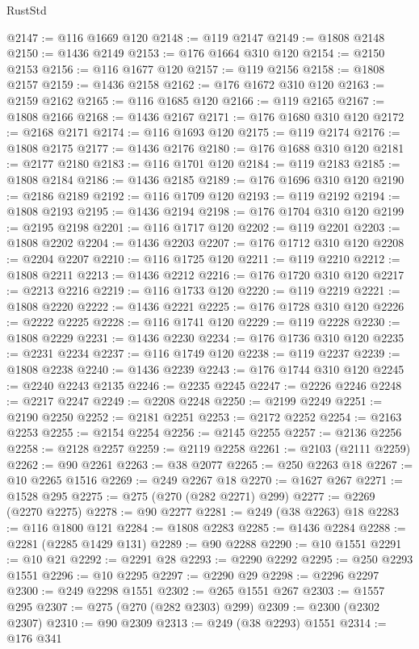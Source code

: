 \begin{lexlean}{RustStd}
\begin{coremodule}
@2147 := @116 @1669 @120
@2148 := @119 @2147
@2149 := @1808 @2148
@2150 := @1436 @2149
@2153 := @176 @1664 @310 @120
@2154 := @2150 @2153
@2156 := @116 @1677 @120
@2157 := @119 @2156
@2158 := @1808 @2157
@2159 := @1436 @2158
@2162 := @176 @1672 @310 @120
@2163 := @2159 @2162
@2165 := @116 @1685 @120
@2166 := @119 @2165
@2167 := @1808 @2166
@2168 := @1436 @2167
@2171 := @176 @1680 @310 @120
@2172 := @2168 @2171
@2174 := @116 @1693 @120
@2175 := @119 @2174
@2176 := @1808 @2175
@2177 := @1436 @2176
@2180 := @176 @1688 @310 @120
@2181 := @2177 @2180
@2183 := @116 @1701 @120
@2184 := @119 @2183
@2185 := @1808 @2184
@2186 := @1436 @2185
@2189 := @176 @1696 @310 @120
@2190 := @2186 @2189
@2192 := @116 @1709 @120
@2193 := @119 @2192
@2194 := @1808 @2193
@2195 := @1436 @2194
@2198 := @176 @1704 @310 @120
@2199 := @2195 @2198
@2201 := @116 @1717 @120
@2202 := @119 @2201
@2203 := @1808 @2202
@2204 := @1436 @2203
@2207 := @176 @1712 @310 @120
@2208 := @2204 @2207
@2210 := @116 @1725 @120
@2211 := @119 @2210
@2212 := @1808 @2211
@2213 := @1436 @2212
@2216 := @176 @1720 @310 @120
@2217 := @2213 @2216
@2219 := @116 @1733 @120
@2220 := @119 @2219
@2221 := @1808 @2220
@2222 := @1436 @2221
@2225 := @176 @1728 @310 @120
@2226 := @2222 @2225
@2228 := @116 @1741 @120
@2229 := @119 @2228
@2230 := @1808 @2229
@2231 := @1436 @2230
@2234 := @176 @1736 @310 @120
@2235 := @2231 @2234
@2237 := @116 @1749 @120
@2238 := @119 @2237
@2239 := @1808 @2238
@2240 := @1436 @2239
@2243 := @176 @1744 @310 @120
@2245 := @2240 @2243 @2135
@2246 := @2235 @2245
@2247 := @2226 @2246
@2248 := @2217 @2247
@2249 := @2208 @2248
@2250 := @2199 @2249
@2251 := @2190 @2250
@2252 := @2181 @2251
@2253 := @2172 @2252
@2254 := @2163 @2253
@2255 := @2154 @2254
@2256 := @2145 @2255
@2257 := @2136 @2256
@2258 := @2128 @2257
@2259 := @2119 @2258
@2261 := @2103 (@2111 @2259)
@2262 := @90 @2261
@2263 := @38 @2077
@2265 := @250 @2263 @18
@2267 := @10 @2265 @1516
@2269 := @249 @2267 @18
@2270 := @1627 @267
@2271 := @1528 @295
@2275 := @275 (@270 (@282 @2271) @299)
@2277 := @2269 (@2270 @2275)
@2278 := @90 @2277
@2281 := @249 (@38 @2263) @18
@2283 := @116 @1800 @121
@2284 := @1808 @2283
@2285 := @1436 @2284
@2288 := @2281 (@2285 @1429 @131)
@2289 := @90 @2288
@2290 := @10 @1551
@2291 := @10 @21
@2292 := @2291 @28
@2293 := @2290 @2292
@2295 := @250 @2293 @1551
@2296 := @10 @2295
@2297 := @2290 @29
@2298 := @2296 @2297
@2300 := @249 @2298 @1551
@2302 := @265 @1551 @267
@2303 := @1557 @295
@2307 := @275 (@270 (@282 @2303) @299)
@2309 := @2300 (@2302 @2307)
@2310 := @90 @2309
@2313 := @249 (@38 @2293) @1551
@2314 := @176 @341

\end{coremodule}
\end{lexlean}
